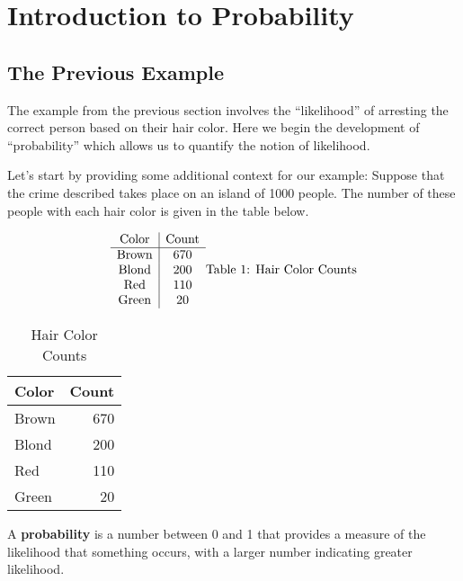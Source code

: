 \documentclass[
]{book}
\begin{document}
\hypertarget{introduction-to-probability}{%
\chapter{Introduction to Probability}\label{introduction-to-probability}}

\hypertarget{the-previous-example}{%
\section{The Previous Example}\label{the-previous-example}}

The example from the previous section involves the ``likelihood'' of arresting the
correct person based on their hair color. Here we begin the development of
``probability'' which allows us to quantify the notion of likelihood.

Let's start by providing some additional context for our example:
Suppose that the crime described takes place on an island of 1000 people.
The number of these people with each hair color is given in the table below.

\[
\begin{array}{c|c}
 \mathrm{Color} & \mathrm{Count} \\ \hline
\mathrm{Brown} & 670  \\ 
\mathrm{Blond} & 200  \\ 
\mathrm{Red} & 110  \\ 
\mathrm{Green} & 20  \\ 
\end{array}\\
\mbox{Table 1: Hair Color Counts}
\]

\begin{table}

\caption{\label{tab:unnamed-chunk-1}Hair Color Counts}
\centering
\begin{tabular}[t]{l|r}
\hline
Color & Count\\
\hline
Brown & 670\\
\hline
Blond & 200\\
\hline
Red & 110\\
\hline
Green & 20\\
\hline
\end{tabular}
\end{table}

A \textbf{probability} is a number between 0 and 1 that provides a measure of the
likelihood that something occurs,
with a larger number indicating greater likelihood.
\end{document}
